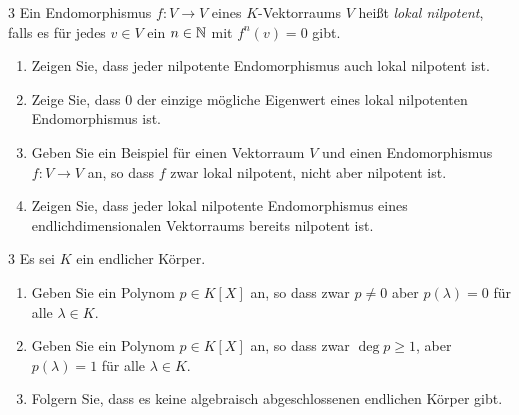\begin{question}[subtitle = Unterscheidung zwischen nilpotenten und lokal nilpotenten Endomorphismen]{3}
  Ein Endomorphismus $f \colon V \to V$ eines $K$-Vektorraums $V$ heißt \emph{lokal nilpotent}, falls es für jedes $v \in V$ ein $n \in \mathbb{N}$ mit $f^n(v) = 0$ gibt.
  \begin{enumerate}[leftmargin=*]
    \item
      Zeigen Sie, dass jeder nilpotente Endomorphismus auch lokal nilpotent ist.
    \item
      Zeige Sie, dass $0$ der einzige mögliche Eigenwert eines lokal nilpotenten Endomorphismus ist.
    \item
      Geben Sie ein Beispiel für einen Vektorraum $V$ und einen Endomorphismus $f \colon V \to V$ an, so dass $f$ zwar lokal nilpotent, nicht aber nilpotent ist.
    \item
      Zeigen Sie, dass jeder lokal nilpotente Endomorphismus eines endlichdimensionalen Vektorraums bereits nilpotent ist.
  \end{enumerate}
\end{question}


\begin{question}[subtitle = Zur Unterscheidung von Polynomen und Polynomsfunktionen]{3}
  Es sei $K$ ein endlicher Körper.
  \begin{enumerate}[leftmargin=*]
    \item
      Geben Sie ein Polynom $p \in K[X]$ an, so dass zwar $p \neq 0$ aber $p(\lambda) = 0$ für alle $\lambda \in K$.
    \item
      Geben Sie ein Polynom $p \in K[X]$ an, so dass zwar $\deg p \geq 1$, aber $p(\lambda) = 1$ für alle $\lambda \in K$.
    \item
      Folgern Sie, dass es keine algebraisch abgeschlossenen endlichen Körper gibt.
  \end{enumerate}
\end{question}


